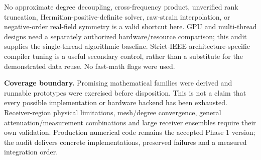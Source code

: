 No approximate degree decoupling, cross-frequency product, unverified rank truncation, Hermitian-positive-definite solver, raw-strain interpolation, or negative-order real-field symmetry is a valid shortcut here. GPU and multi-thread designs need a separately authorized hardware/resource comparison; this audit supplies the single-thread algorithmic baseline. Strict-IEEE architecture-specific compiler tuning is a useful secondary control, rather than a substitute for the demonstrated data reuse. No fast-math flags were used.

\textbf{Coverage boundary.} Promising mathematical families were derived and runnable prototypes were exercised before disposition. This is not a claim that every possible implementation or hardware backend has been exhausted. Receiver-region physical limitations, mesh/degree convergence, general attenuation/measurement combinations and large receiver ensembles require their own validation. Production numerical code remains the accepted Phase 1 version; the audit delivers concrete implementations, preserved failures and a measured integration order.

\clearpage
